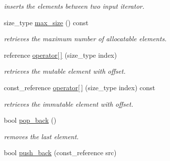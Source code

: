 \begin{DoxyCompactItemize}
\begin{DoxyCompactList}\small\item\em inserts the elements between two input iterator. \end{DoxyCompactList}\item 
\hypertarget{classhryky_1_1_vector_a21d0f3baf14bced98efbf2c23790fd95}{size\-\_\-type \hyperlink{classhryky_1_1_vector_a21d0f3baf14bced98efbf2c23790fd95}{max\-\_\-size} () const }\label{classhryky_1_1_vector_a21d0f3baf14bced98efbf2c23790fd95}

\begin{DoxyCompactList}\small\item\em retrieves the maximum number of allocatable elements. \end{DoxyCompactList}\item 
\hypertarget{classhryky_1_1_vector_a6fb915248cdb9b8ae21edd5379dd6777}{reference \hyperlink{classhryky_1_1_vector_a6fb915248cdb9b8ae21edd5379dd6777}{operator\mbox{[}$\,$\mbox{]}} (size\-\_\-type index)}\label{classhryky_1_1_vector_a6fb915248cdb9b8ae21edd5379dd6777}

\begin{DoxyCompactList}\small\item\em retrieves the mutable element with offset. \end{DoxyCompactList}\item 
\hypertarget{classhryky_1_1_vector_ad9a57bc485b9b2f17432715c920006b2}{const\-\_\-reference \hyperlink{classhryky_1_1_vector_ad9a57bc485b9b2f17432715c920006b2}{operator\mbox{[}$\,$\mbox{]}} (size\-\_\-type index) const }\label{classhryky_1_1_vector_ad9a57bc485b9b2f17432715c920006b2}

\begin{DoxyCompactList}\small\item\em retrieves the immutable element with offset. \end{DoxyCompactList}\item 
\hypertarget{classhryky_1_1_vector_ab66b1fda88244ae10810c7e883d34d6f}{bool \hyperlink{classhryky_1_1_vector_ab66b1fda88244ae10810c7e883d34d6f}{pop\-\_\-back} ()}\label{classhryky_1_1_vector_ab66b1fda88244ae10810c7e883d34d6f}

\begin{DoxyCompactList}\small\item\em removes the last element. \end{DoxyCompactList}\item 
\hypertarget{classhryky_1_1_vector_ad977480678e6051db6d10a6abc3a54b7}{bool \hyperlink{classhryky_1_1_vector_ad977480678e6051db6d10a6abc3a54b7}{push\-\_\-back} (const\-\_\-reference src)}\label{classhryky_1_1_vector_ad977480678e6051db6d10a6abc3a54b7}


\end{DoxyCompactItemize}
